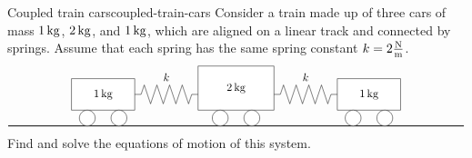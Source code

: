\begin{example}{Coupled train cars}{coupled-train-cars}
  Consider a train made up of three cars of mass $1\mathop{\textrm{\rm kg}}\nolimits$, $2\mathop{\textrm{\rm kg}}\nolimits$, and
  $1\mathop{\textrm{\rm kg}}\nolimits$, which are aligned on a linear track and connected by
  springs. Assume that each spring has the same spring constant
  $k=2\frac{\mathop{\textrm{\rm N}}\nolimits}{\mathop{\textrm{\rm m}}\nolimits}$.
  \begin{equation*}
    \begin{tikzpicture}
      \draw[thick] (0,0) -- (14.4,0);
      \begin{scope}
        \draw[fill=white] (2,0.5) rectangle node {$1\kg$} (4,1.5);
        \draw[fill=white] (2.5,0.25) circle (0.25);
        \draw[fill=white] (3.5,0.25) circle (0.25);
      \end{scope}
      \begin{scope}[xshift=4.2cm]
        \draw[fill=white] (1.8,0.5) rectangle node {$2\kg$} (4.2,1.9);
        \draw[fill=white] (2.5,0.25) circle (0.25);
        \draw[fill=white] (3.5,0.25) circle (0.25);
      \end{scope}
      \begin{scope}[xshift=8.4cm]
        \draw[fill=white] (2,0.5) rectangle node {$1\kg$} (4,1.5);
        \draw[fill=white] (2.5,0.25) circle (0.25);
        \draw[fill=white] (3.5,0.25) circle (0.25);
      \end{scope}
      \begin{scope}[xshift=4cm]
        \draw (0,1) -- (0.2,1) -- ++(0.1,0.3)
        -- ++(0.2,-0.6) -- ++(0.2,0.6)
        -- ++(0.2,-0.6) -- ++(0.2,0.6)
        -- ++(0.2,-0.6) -- ++(0.2,0.6)
        -- ++(0.2,-0.6) -- ++(0.1,0.3)
        -- (2,1);
        \draw (1,1.3) node[above] {$k$};
      \end{scope}
      \begin{scope}[xshift=8.4cm]
        \draw (0,1) -- (0.2,1) -- ++(0.1,0.3)
        -- ++(0.2,-0.6) -- ++(0.2,0.6)
        -- ++(0.2,-0.6) -- ++(0.2,0.6)
        -- ++(0.2,-0.6) -- ++(0.2,0.6)
        -- ++(0.2,-0.6) -- ++(0.1,0.3)
        -- (2,1);
        \draw (1,1.3) node[above] {$k$};
      \end{scope}
    \end{tikzpicture}
  \end{equation*}
  Find and solve the equations of motion of this system.
\end{example}


